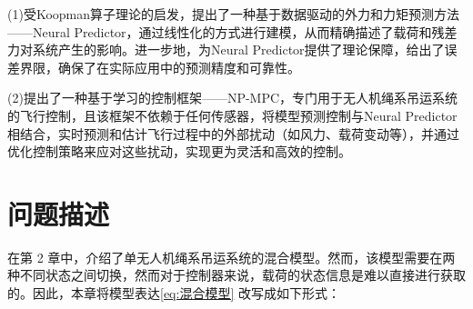 \documentclass[lang=chs, degree=master, blindreview=false, winfonts=true]{yanputhesis}
\begin{document}
(1)受Koopman算子理论的启发，提出了一种基于数据驱动的外力和力矩预测方法——Neural Predictor，通过线性化的方式进行建模，从而精确描述了载荷和残差力对系统产生的影响。进一步地，为Neural Predictor提供了理论保障，给出了误差界限，确保了在实际应用中的预测精度和可靠性。

(2)提出了一种基于学习的控制框架——NP-MPC，专门用于无人机绳系吊运系统的飞行控制，且该框架不依赖于任何传感器，将模型预测控制与Neural Predictor相结合，实时预测和估计飞行过程中的外部扰动（如风力、载荷变动等），并通过优化控制策略来应对这些扰动，实现更为灵活和高效的控制。






\section{问题描述}
在第 2 章中，介绍了单无人机绳系吊运系统的混合模型。然而，该模型需要在两种不同状态之间切换，然而对于控制器来说，载荷的状态信息是难以直接进行获取的。因此，本章将模型表达\autoref{eq:混合模型} 改写成如下形式：
\end{document}
